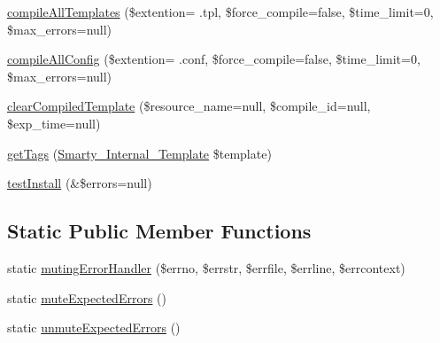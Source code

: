 \begin{DoxyCompactItemize}
\item 
\hyperlink{class_smarty_ad7b65685cb72a1e686482c5dd6e2b1d6}{compile\+All\+Templates} (\$extention= \textquotesingle{}.tpl\textquotesingle{}, \$force\+\_\+compile=false, \$time\+\_\+limit=0, \$max\+\_\+errors=null)
\item 
\hyperlink{class_smarty_ae3bebd6073dddd2e528c9c0b0e0a4ebd}{compile\+All\+Config} (\$extention= \textquotesingle{}.conf\textquotesingle{}, \$force\+\_\+compile=false, \$time\+\_\+limit=0, \$max\+\_\+errors=null)
\item 
\hyperlink{class_smarty_a28988af24bbe01d0107fc29c9fff26e5}{clear\+Compiled\+Template} (\$resource\+\_\+name=null, \$compile\+\_\+id=null, \$exp\+\_\+time=null)
\item 
\hyperlink{class_smarty_a3fb1a4a7e826939df9707fc9aa4a5c6b}{get\+Tags} (\hyperlink{class_smarty___internal___template}{Smarty\+\_\+\+Internal\+\_\+\+Template} \$template)
\item 
\hyperlink{class_smarty_af8c70f6b1712e564e97ae5742b0290f4}{test\+Install} (\&\$errors=null)
\end{DoxyCompactItemize}
\subsection*{Static Public Member Functions}
\begin{DoxyCompactItemize}
\item 
static \hyperlink{class_smarty_a6565461ac93814845c8395368d2eb047}{muting\+Error\+Handler} (\$errno, \$errstr, \$errfile, \$errline, \$errcontext)
\item 
static \hyperlink{class_smarty_a3c60bb37676992fdc406b34476168f9e}{mute\+Expected\+Errors} ()
\item 
static \hyperlink{class_smarty_a317f0a148011c641c316b2dc0270ed0e}{unmute\+Expected\+Errors} ()
\end{DoxyCompactItemize}
